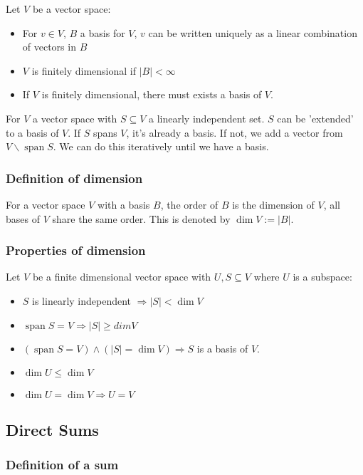 \documentclass[a4paper, 12pt, twoside]{article}
\DeclareMathOperator{\Spa}{span}
\begin{document}
Let $V$ be a vector space:

\begin{itemize}
  \item For $v \in V$, $B$ a basis for $V$, $v$ can be written uniquely
        as a linear combination of vectors in $B$
  \item $V$ is finitely dimensional if $|B| < \infty$
  \item If $V$ is finitely dimensional, there must exists a basis of $V$.
\end{itemize}

For $V$ a vector space with $S \subseteq V$ a linearly independent set.
$S$ can be 'extended' to a basis of $V$. If $S$ spans $V$, it's
already a basis. If not, we add a vector from $V\backslash\Spa{S}$.
We can do this iteratively until we have a basis.

\subsubsection{Definition of dimension}

For a vector space $V$ with a basis $B$, the order of $B$ is the dimension
of $V$, all bases of $V$ share the same order. This is denoted by
$\dim{V} := |B|$.

\subsubsection{Properties of dimension}

Let $V$ be a finite dimensional vector space with $U, S \subseteq V$
where $U$ is a subspace:

\begin{itemize}
  \item $S$ is linearly independent $\Rightarrow |S| < \dim{V}$
  \item $\Spa{S} = V \Rightarrow |S| \geq dim{V}$
  \item $(\Spa{S} = V) \land (|S| = \dim{V})
          \Rightarrow S$ is a basis of $V$.
  \item $\dim{U} \leq \dim{V}$
  \item $\dim{U} = \dim{V} \Rightarrow U = V$
\end{itemize}

\subsection{Direct Sums}

\subsubsection{Definition of a sum}
\end{document}
